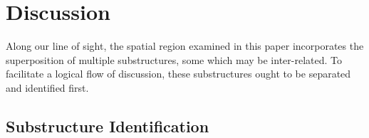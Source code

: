 \documentclass{emulateapj}
\begin{document}
		



	\section{Discussion}
	\label{sec:discussion}

	Along our line of sight, the spatial region examined in this paper incorporates the superposition of multiple substructures, some which may be inter-related. To facilitate a logical flow of discussion, these substructures ought to be separated and identified first. 	
		
		\subsection{Substructure Identification}
		\label{sec:substructure-identification}
		
\end{document}
